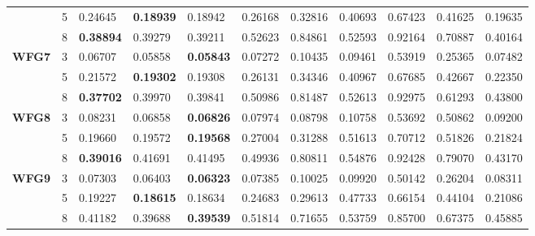 \documentclass[conference]{IEEEtran}
\begin{document}
\begin{table*}[!htb]
\begin{tabular}{|l|l|l|l|l|l|l|l|l|l|l|}
		\textbf{}        & 5          & 0.24645          & \textbf{0.18939}  & 0.18942               & 0.26168          & 0.32816             & 0.40693             & 0.67423            & 0.41625              & 0.19635          \\ \cline{2-11} 
		\textbf{}        & 8          & \textbf{0.38894} & 0.39279           & 0.39211               & 0.52623          & 0.84861             & 0.52593             & 0.92164            & 0.70887              & 0.40164          \\ \hline
		\textbf{WFG7}    & 3          & 0.06707          & 0.05858           & \textbf{0.05843}      & 0.07272          & 0.10435             & 0.09461             & 0.53919            & 0.25365              & 0.07482          \\ \cline{2-11} 
		\textbf{}        & 5          & 0.21572          & \textbf{0.19302}  & 0.19308               & 0.26131          & 0.34346             & 0.40967             & 0.67685            & 0.42667              & 0.22350          \\ \cline{2-11} 
		\textbf{}        & 8          & \textbf{0.37702} & 0.39970           & 0.39841               & 0.50986          & 0.81487             & 0.52613             & 0.92975            & 0.61293              & 0.43800          \\ \hline
		\textbf{WFG8}    & 3          & 0.08231          & 0.06858           & \textbf{0.06826}      & 0.07974          & 0.08798             & 0.10758             & 0.53692            & 0.50862              & 0.09200          \\ \cline{2-11} 
		\textbf{}        & 5          & 0.19660          & 0.19572           & \textbf{0.19568}      & 0.27004          & 0.31288             & 0.51613             & 0.70712            & 0.51826              & 0.21824          \\ \cline{2-11} 
		\textbf{}        & 8          & \textbf{0.39016} & 0.41691           & 0.41495               & 0.49936          & 0.80811             & 0.54876             & 0.92428            & 0.79070              & 0.43170          \\ \hline
		\textbf{WFG9}    & 3          & 0.07303          & 0.06403           & \textbf{0.06323}      & 0.07385          & 0.10025             & 0.09920             & 0.50142            & 0.26204              & 0.08311          \\ \cline{2-11} 
		\textbf{}        & 5          & 0.19227          & \textbf{0.18615}  & 0.18634               & 0.24683          & 0.29613             & 0.47733             & 0.66154            & 0.44104              & 0.21086          \\ \cline{2-11} 
		\textbf{}        & 8          & 0.41182          & 0.39688           & \textbf{0.39539}      & 0.51814          & 0.71655             & 0.53759             & 0.85700            & 0.67375              & 0.45885          \\ \hline
	\end{tabular}
\end{table*} 
\end{document}
